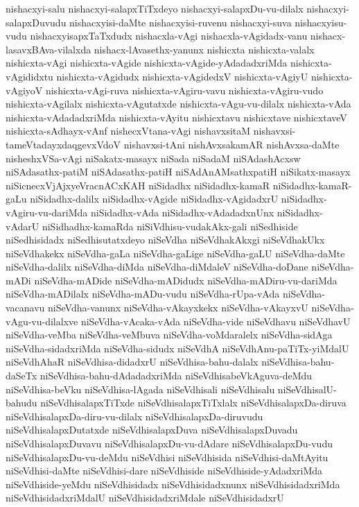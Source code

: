 {nishacxyi-salu
nishacxyi-salapxTiTxdeyo
nishacxyi-salapxDu-vu-dilalx
nishacxyi-salapxDuvudu
nishacxyisi-daMte
nishacxyisi-ruvenu
nishacxyi-suva
nishacxyisu-vudu
nishacxyisapxTaTxdudx
nishacxla-vAgi
nishacxla-vAgidadx-vanu
nishacx-lasavxBAva-vilalxda
nishacx-lAvasethx-yanunx
nishicxta
nishicxta-valalx
nishicxta-vAgi
nishicxta-vAgide
nishicxta-vAgide-yAdadadxriMda
nishicxta-vAgididxtu
nishicxta-vAgidudx
nishicxta-vAgidedxV
nishicxta-vAgiyU
nishicxta-vAgiyoV
nishicxta-vAgi-ruva
nishicxta-vAgiru-vavu
nishicxta-vAgiru-vudo
nishicxta-vAgilalx
nishicxta-vAgutatxde
nishicxta-vAgu-vu-dilalx
nishicxta-vAda
nishicxta-vAdadadxriMda
nishicxta-vAyitu
nishicxtavu
nishicxtave
nishicxtaveV
nishicxta-sAdhayx-vAnf
nishecxVtana-vAgi
nishavxsitaM
nishavxsi-tameVtadayxdaqgevxVdoV
nishavxsi-tAni
nishAvxsakamAR
nishAvxsa-daMte
nisheshxVSa-vAgi
niSakatx-masayx
niSada
niSadaM
niSAdashAcxsw
niSAdasathx-patiM
niSAdasathx-patiH
niSAdAnAMsathxpatiH
niSikatx-masayx
niSicnecxVjAjxyeVracnACxKAH
niSidadhx
niSidadhx-kamaR
niSidadhx-kamaR-gaLu
niSidadhx-dalilx
niSidadhx-vAgide
niSidadhx-vAgidadxrU
niSidadhx-vAgiru-vu-dariMda
niSidadhx-vAda
niSidadhx-vAdadadxnUnx
niSidadhx-vAdarU
niSidhadhx-kamaRda
niSiVdhisu-vudakAkx-gali
niSedhiside
niSedhisidadx
niSedhisutatxdeyo
niSeVdha
niSeVdhakAkxgi
niSeVdhakUkx
niSeVdhakekx
niSeVdha-gaLa
niSeVdha-gaLige
niSeVdha-gaLU
niSeVdha-daMte
niSeVdha-dalilx
niSeVdha-diMda
niSeVdha-diMdaleV
niSeVdha-doDane
niSeVdha-mADi
niSeVdha-mADide
niSeVdha-mADidudx
niSeVdha-mADiru-vu-dariMda
niSeVdha-mADilalx
niSeVdha-mADu-vudu
niSeVdha-rUpa-vAda
niSeVdha-vacanavu
niSeVdha-vanunx
niSeVdha-vAkayxkekx
niSeVdha-vAkayxvU
niSeVdha-vAgu-vu-dilalxve
niSeVdha-vAcaka-vAda
niSeVdha-vide
niSeVdhavu
niSeVdhavU
niSeVdha-veMba
niSeVdha-veMbuva
niSeVdha-voMdaralelx
niSeVdha-sidAga
niSeVdha-sidadxriMda
niSeVdha-sidudx
niSeVdhA
niSeVdhAnu-paTiTx-yiMdalU
niSeVdhAhaR
niSeVdhisa-didadxrU
niSeVdhisa-bahu-dalalx
niSeVdhisa-bahu-daSeTx
niSeVdhisa-bahu-dAdadadxriMda
niSeVdhisabeVkAguva-deMdu
niSeVdhisa-beVku
niSeVdhisa-lAgada
niSeVdhisali
niSeVdhisalu
niSeVdhisalU-bahudu
niSeVdhisalapxTiTxde
niSeVdhisalapxTiTxlalx
niSeVdhisalapxDa-diruva
niSeVdhisalapxDa-diru-vu-dilalx
niSeVdhisalapxDa-diruvudu
niSeVdhisalapxDutatxde
niSeVdhisalapxDuva
niSeVdhisalapxDuvadu
niSeVdhisalapxDuvavu
niSeVdhisalapxDu-vu-dAdare
niSeVdhisalapxDu-vudu
niSeVdhisalapxDu-vu-deMdu
niSeVdhisi
niSeVdhisida
niSeVdhisi-daMtAyitu
niSeVdhisi-daMte
niSeVdhisi-dare
niSeVdhiside
niSeVdhiside-yAdadxriMda
niSeVdhiside-yeMdu
niSeVdhisidadx
niSeVdhisidadxnunx
niSeVdhisidadxriMda
niSeVdhisidadxriMdalU
niSeVdhisidadxriMdale
niSeVdhisidadxrU
}
